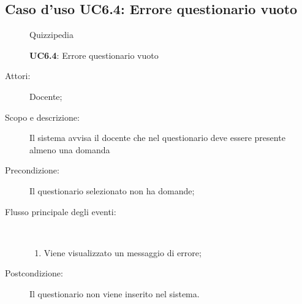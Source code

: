 \subsection{Caso d'uso UC6.4: Errore questionario vuoto}
	\begin{figure}[H]
		\centering
		\begin{resizedtikzpicture}{\textwidth}
		\begin{umlsystem}[x=0, fill=lightgray!20]{Quizzipedia}
		\end{umlsystem}
		\end{resizedtikzpicture}
		\caption{\textbf{UC6.4}: Errore questionario vuoto}
		\label{UC6.4}
	\end{figure}
\begin{description}
\item[Attori:] Docente;
\item[Scopo e descrizione:] Il sistema avvisa il docente che nel questionario deve essere presente almeno una domanda
      \item[Precondizione:] Il questionario selezionato non ha domande;

        \item[Flusso principale degli eventi:] \ 
 \begin{enumerate}
          \item Viene visualizzato un messaggio di errore;

      \end{enumerate}
    \item[Postcondizione:] Il questionario non viene inserito nel sistema.
  \end{description}
\hypertarget{UC6.5}{}
